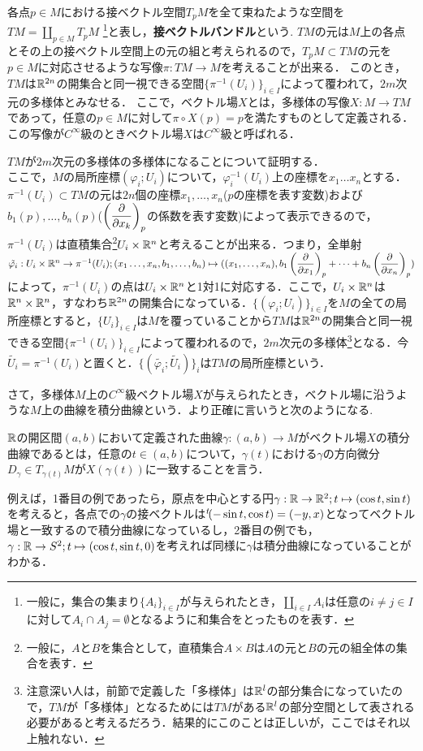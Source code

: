 \begin{s_defi}
各点$p\in M$における接ベクトル空間$T_pM$を全て束ねたような空間を$TM=\coprod_{p\in M}T_pM$
\footnote{一般に，集合の集まり$\{A_i\}_{i\in I}$が与えられたとき，$\coprod_{i\in I}A_i$は任意の$i\neq j\in I$に対して$A_i\cap A_j=\emptyset$となるように和集合をとったものを表す．}と表し，\textbf{接ベクトルバンドル}という.
$TM$の元は$M$上の各点とその上の接ベクトル空間上の元の組と考えられるので，$T_pM\subset TM$の元を$p\in M$に対応させるような写像$\pi:TM\rightarrow M$を考えることが出来る．
このとき，$TM$は${\mathbb R}^{2n}$の開集合と同一視できる空間$\{\pi^{-1}(U_i)\}_{i\in I}$によって覆われて，$2m$次元の多様体とみなせる．
ここで，ベクトル場$X$とは，多様体の写像$X:M\rightarrow TM$であって，任意の$p\in M$に対して$\pi\circ X(p) = p$を満たすものとして定義される．この写像が$C^{\infty}$級のときベクトル場$X$は$C^{\infty}$級と呼ばれる．
\end{s_defi}
\begin{Proof}
$TM$が$2m$次元の多様体の多様体になることについて証明する．\\
ここで，$M$の局所座標$(\varphi_i;U_i)$について，$\varphi_i^{-1}(U_i)$上の座標を$x_1\dots x_n$とする．$\pi^{-1}(U_i)\subset TM$の元は$2n$個の座標$x_1,\dots,x_n$($p$の座標を表す変数)および$b_1(p),\dots,b_n(p)$($\left(\dfrac{\partial}{\partial x_k}\right)_p$の係数を表す変数)によって表示できるので，$\pi^{-1}(U_i)$は直積集合\footnote{一般に，$A$と$B$を集合として，直積集合$A\times B$は$A$の元と$B$の元の組全体の集合を表す．}$U_i\times {\mathbb R}^n$と考えることが出来る．つまり，全単射$\tilde{\varphi_i}:U_i\times {\mathbb R}^n\rightarrow\pi^{-1}(U_i);(x_1\dots,x_n,b_1,\dots,b_n)\mapsto ((x_1,\dots,x_n),b_1\left(\dfrac{\partial}{\partial x_1}\right)_p+\dots+b_n\left(\dfrac{\partial}{\partial x_n}\right)_p)$によって，$\pi^{-1}(U_i)$の点は$U_i\times{\mathbb R}^n$と1対1に対応する．ここで，$U_i\times {\mathbb R}^n$は${\mathbb R}^n\times {\mathbb R}^n$，すなわち${\mathbb R}^{2n}$の開集合になっている．$\{(\varphi_i;U_i)\}_{i\in I}$を$M$の全ての局所座標とすると，$\{U_i\}_{i\in I}$は$M$を覆っていることから$TM$は${\mathbb R}^{2n}$の開集合と同一視できる空間$\{\pi^{-1}(U_i)\}_{i\in I}$によって覆われるので，$2m$次元の多様体\footnote{注意深い人は，前節で定義した「多様体」は${\mathbb R}^l$の部分集合になっていたので，$TM$が「多様体」となるためには$TM$がある${\mathbb R}^l$の部分空間として表される必要があると考えるだろう．結果的にこのことは正しいが，ここではそれ以上触れない．}となる．今$\tilde{U_i}=\pi^{-1}(U_i)$と置くと．$\{(\tilde{\varphi_i};\tilde{U_i})\}_i$は$TM$の局所座標という．
\end{Proof}
さて，多様体$M$上の$C^\infty$級ベクトル場$X$が与えられたとき，ベクトル場に沿うような$M$上の曲線を積分曲線という．より正確に言いうと次のようになる.
\begin{s_defi}
${\mathbb R}$の開区間$(a,b)$において定義された曲線$\gamma:(a,b)\rightarrow M$がベクトル場$X$の積分曲線であるとは，任意の$t\in(a,b)$について，$\gamma(t)$における$\gamma$の方向微分$D_\gamma\in T_{\gamma(t)}M$が$X(\gamma(t))$に一致することを言う．
\end{s_defi}
例えば，1番目の例であったら，原点を中心とする円$\gamma:{\mathbb R}\rightarrow {\mathbb R}^2;t\mapsto (\cos t,\sin t)$を考えると，各点での$\gamma$の接ベクトルは${}^t\!(-\sin t,\cos t)=(-y,x)$となってベクトル場と一致するので積分曲線になっているし，2番目の例でも，$\gamma:{\mathbb R}\rightarrow S^2;t\mapsto (\cos t,\sin t,0)$を考えれば同様に$\gamma$は積分曲線になっていることがわかる．

